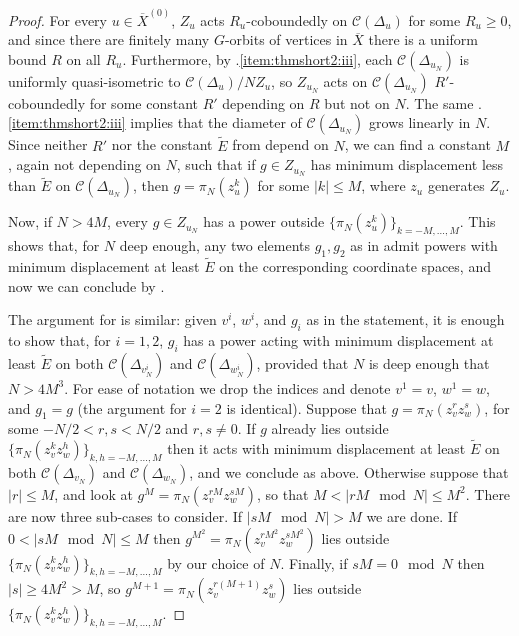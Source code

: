 \documentclass[svgnames]{amsart}
\theoremstyle{plain}
\theoremstyle{definition}
\newcommand{\C}[1]{\mathcal{C}(#1)}
\newcommand{\ov}[1]{\overline{#1}}
\begin{document}
\begin{proof} For every $u\in \ov X^{(0)}$, $Z_u$ acts $R_u$-coboundedly on $\C{\Delta_u}$ for some $R_u\ge 0$, and since there are finitely many $G$-orbits of vertices in $\ov X$ there is a uniform bound $R$ on all $R_u$. 
Furthermore, by .\ref{item:thmshort2:iii}, each $\C{\Delta_{u_N}}$ is uniformly quasi-isometric to $\C{\Delta_{u}}/NZ_u$, so $Z_{u_N}$ acts on $\C{\Delta_{u_N}}$ $R'$-coboundedly for some constant $R'$ depending on $R$ but not on $N$. The same .\ref{item:thmshort2:iii} implies that the diameter of $\C{\Delta_{u_N}}$ grows linearly in $N$. Since neither $R'$ nor the constant $\widetilde{E}$ from  depend on $N$, we can find a constant $M$, again not depending on $N$, such that if $g\in Z_{u_N}$ has minimum displacement less than $\widetilde{E}$ on $\C{\Delta_{u_N}}$, then $g=\pi_N(z_u^k)$ for some $|k|\le M$, where $z_u$ generates $Z_u$. 

Now, if $N>4M$, every $g\in Z_{u_N}$ has a power outside $\{\pi_N(z_u^k)\}_{k=-M,\ldots,M}$. This shows that, for $N$ deep enough, any two elements $g_1,g_2$ as in  admit powers with minimum displacement at least $\widetilde{E}$ on the corresponding coordinate spaces, and now we can conclude by . 

The argument for  is similar: given $v^i$, $w^i$, and $g_i$ as in the statement, it is enough to show that, for $i=1,2$, $g_i$ has a power acting with minimum displacement at least $\widetilde{E}$ on both $\C{\Delta_{v^i_N}}$ and $\C{\Delta_{w^i_N}}$, provided that $N$ is deep enough that $N>4M^3$. For ease of notation we drop the indices and denote $v^1=v$, $w^1=w$, and $g_1=g$ (the argument for $i=2$ is identical). Suppose that $g=\pi_N(z_v^r z_w^s)$, for some $-N/2<r,s<N/2$ and $r,s\neq 0$. If $g$ already lies outside $\{\pi_N(z_v^k z_w^h)\}_{k,h=-M,\ldots,M}$ then it acts with minimum displacement at least $\widetilde{E}$ on both $\C{\Delta_{v_N}}$ and $\C{\Delta_{w_N}}$, and we conclude as above. Otherwise suppose that $|r|\le M$, and look at $g^M=\pi_N(z_v^{rM} z_w^{sM})$, so that $M<|rM\mod N|\le M^2$. There are now three sub-cases to consider. If $|sM\mod N|>M$ we are done. If $0<|sM\mod N|\le M$ then $g^{M^2}=\pi_N(z_v^{rM^2} z_w^{sM^2})$ lies outside $\{\pi_N(z_v^k z_w^h)\}_{k,h=-M,\ldots,M}$ by our choice of $N$. Finally, if $sM=0\mod N$ then $|s|\ge 4M^2>M$, so $g^{M+1}=\pi_N(z_v^{r(M+1)} z_w^{s})$ lies outside $\{\pi_N(z_v^k z_w^h)\}_{k,h=-M,\ldots,M}$.
\end{proof}
\end{document}
